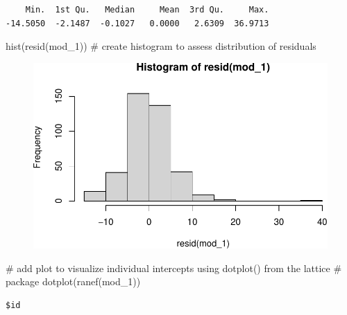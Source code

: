\documentclass[
  letterpaper,
  DIV=11,
  numbers=noendperiod]{scrreprt}
\newenvironment{Shaded}{\begin{snugshade}}{\end{snugshade}}
\newcommand{\CommentTok}[1]{\textcolor[rgb]{0.37,0.37,0.37}{#1}}
\newcommand{\FunctionTok}[1]{\textcolor[rgb]{0.28,0.35,0.67}{#1}}
\newcommand{\NormalTok}[1]{\textcolor[rgb]{0.00,0.23,0.31}{#1}}
\begin{document}
\begin{verbatim}
    Min.  1st Qu.   Median     Mean  3rd Qu.     Max. 
-14.5050  -2.1487  -0.1027   0.0000   2.6309  36.9713 
\end{verbatim}

\begin{Shaded}
\begin{Highlighting}[]
\FunctionTok{hist}\NormalTok{(}\FunctionTok{resid}\NormalTok{(mod\_1))  }\CommentTok{\# create histogram to assess distribution of residuals}
\end{Highlighting}
\end{Shaded}

\begin{figure}[H]

{\centering \includegraphics{Longi_mixeffect_files/figure-pdf/unnamed-chunk-7-1.pdf}

}

\end{figure}

\begin{Shaded}
\begin{Highlighting}[]
\CommentTok{\# add plot to visualize individual intercepts using dotplot() from the lattice}
\CommentTok{\# package}
\FunctionTok{dotplot}\NormalTok{(}\FunctionTok{ranef}\NormalTok{(mod\_1))}
\end{Highlighting}
\end{Shaded}

\begin{verbatim}
$id
\end{verbatim}
\end{document}
